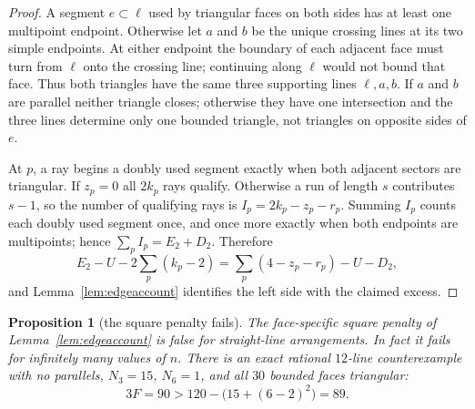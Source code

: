 \documentclass[11pt]{article}
\newtheorem{proposition}[theorem]{Proposition}
\theoremstyle{definition}
\begin{document}
\begin{proof}
A segment $e\subset\ell$ used by triangular faces on both sides has at least
one multipoint endpoint. Otherwise let $a$ and $b$ be the unique crossing
lines at its two simple endpoints. At either endpoint the boundary of each
adjacent face must turn from $\ell$ onto the crossing line; continuing along
$\ell$ would not bound that face. Thus both triangles have the same three
supporting lines $\ell,a,b$. If $a$ and $b$ are parallel neither triangle
closes; otherwise they have one intersection and the three lines determine
only one bounded triangle, not triangles on opposite sides of $e$.

At $p$, a ray begins a doubly used segment exactly when both adjacent sectors
are triangular. If $z_p=0$ all $2k_p$ rays qualify. Otherwise a run of length
$s$ contributes $s-1$, so the number of qualifying rays is
$I_p=2k_p-z_p-r_p$. Summing $I_p$ counts each doubly used segment once, and
once more exactly when both endpoints are multipoints; hence
$\sum_p I_p=E_2+D_2$. Therefore
\[
 E_2-U-2\sum_p(k_p-2)
 =\sum_p(4-z_p-r_p)-U-D_2,
\]
and Lemma~\ref{lem:edgeaccount} identifies the left side with the claimed
excess.
\end{proof}


\begin{proposition}[the square penalty fails]\label{prop:squarefail}
The face-specific square penalty of Lemma~\ref{lem:edgeaccount} is false for
straight-line arrangements. In fact it fails for infinitely many values of
$n$. There is an exact rational $12$-line counterexample with no parallels,
$N_3=15$, $N_6=1$, and all $30$ bounded faces triangular:
\[
 3F=90>120-\bigl(15+(6-2)^2\bigr)=89.
\]
\end{proposition}
\end{document}
